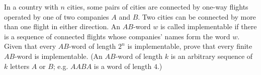 In a country with $n$ cities, some pairs of cities are connected by one-way flights operated by one of two companies $A$ and $B$. Two cities can be connected by more than one flight in either direction. An $AB$-word $w$ is called implementable if there is a sequence of connected flights whose companies’ names form the word $w$. Given that every $AB$-word of length $ 2^n $ is implementable, prove that every finite $AB$-word is implementable. (An $AB$-word of length $k$ is an arbitrary sequence of $k$ letters $A $ or $B$; e.g. $ AABA $ is a word of length $4$.)